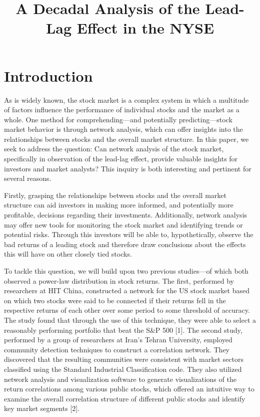\documentclass{article}
\title{A Decadal Analysis of the Lead-Lag Effect in the NYSE}
\begin{document}
\maketitle
\section{Introduction}
\large
As is widely known, the stock market is a complex system in which a multitude of factors influence the performance of individual stocks and the market as a whole. One method for comprehending—and potentially predicting—stock market behavior is through network analysis, which can offer insights into the relationships between stocks and the overall market structure. In this paper, we seek to address the question: Can network analysis of the stock market, specifically in observation of the lead-lag effect, provide valuable insights for investors and market analysts? This inquiry is both interesting and pertinent for several reasons.

Firstly, grasping the relationships between stocks and the overall market structure can aid investors in making more informed, and potentially more profitable, decisions regarding their investments. Additionally, network analysis may offer new tools for monitoring the stock market and identifying trends or potential risks. Through this investors will be able to, hypothetically, observe the bad returns of a leading stock and therefore draw conclusions about the effects this will have on other closely tied stocks.

To tackle this question, we will build upon two previous studies—of which both observed a power-law distribution in stock returns. The first, performed by researchers at HIT China, constructed a network for the US stock market based on which two stocks were said to be connected if their returns fell in the respective returns of each other over some period to some threshold of accuracy. The study found that through the use of this technique, they were able to select a reasonably performing portfolio that beat the S\&P 500 [1]. The second study, performed by a group of researchers at Iran's Tehran University, employed community detection techniques to construct a correlation network. They discovered that the resulting communities were consistent with market sectors classified using the Standard Industrial Classification code. They also utilized network analysis and visualization software to generate visualizations of the return correlations among various public stocks, which offered an intuitive way to examine the overall correlation structure of different public stocks and identify key market segments [2].
\end{document}
